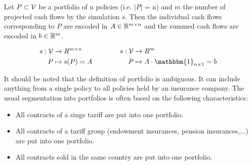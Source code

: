\begin{definition}
	Let $P \subset \mathcal{V}$ be a portfolio of n policies (i.e. $\vert P \vert$ = n) and $m$ the number of projected cash flows by the simulation $s$. Then the individual cash flows corresponding to $P$ are encoded in $A \in \mathbb{R}^{m \times n}$ and the summed cash flows are encoded in $b \in \mathbb{R}^m$.

	\begin{equation*}
	\begin{aligned}[c]
	s: \V &\rightarrow R^{m \times n}\\
		P & \mapsto s(P)=A\\
	\end{aligned}
	\qquad \qquad
	\begin{aligned}[c]
	s: \V &\rightarrow R^m\\
		P & \mapsto A \cdot \mathbbm{1}_{n \times 1} = b \\
	\end{aligned}
	\end{equation*}
	
\end{definition}

\begin{remark}
	It should be noted that the definition of portfolio is ambiguous. It can include anything from a single policy to all policies held by an insurance company. The usual segmentation into portfolios is often based on the following characteristics:
	\begin{itemize}
		\item All contracts of a singe tariff are put into one portfolio.
		\item All contracts of a tariff group (endowment insurances, pension insurances,...) are put into one portfolio. 
		\item All contracts sold in the same country are put into one portfolio.
	\end{itemize} 
\end{remark}

